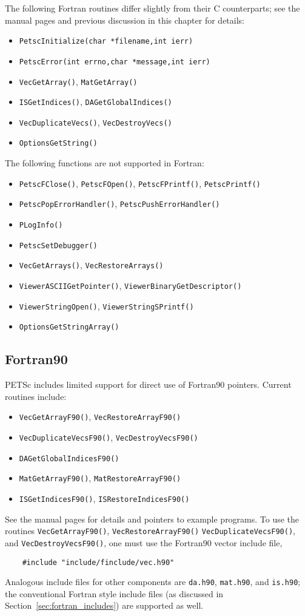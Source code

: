 The following Fortran routines differ slightly from their C counterparts; see the 
manual pages and previous discussion in this chapter for details:
\begin{itemize}
\item {\tt PetscInitialize(char *filename,int ierr)}
\item {\tt PetscError(int errno,char *message,int ierr)}
\item {\tt VecGetArray()}, {\tt MatGetArray()}
\item {\tt ISGetIndices()}, {\tt DAGetGlobalIndices()}
\item {\tt VecDuplicateVecs()}, {\tt VecDestroyVecs()}
\item {\tt OptionsGetString()}
\end{itemize}
The following functions are not supported in Fortran:
\begin{itemize}
\item {\tt PetscFClose()}, {\tt PetscFOpen()}, {\tt PetscFPrintf()}, {\tt PetscPrintf()}
\item {\tt PetscPopErrorHandler()}, {\tt PetscPushErrorHandler()}
\item {\tt PLogInfo()}
\item {\tt PetscSetDebugger()}
\item {\tt VecGetArrays()}, {\tt VecRestoreArrays()}
\item {\tt ViewerASCIIGetPointer()}, {\tt ViewerBinaryGetDescriptor()}
\item {\tt ViewerStringOpen()}, {\tt ViewerStringSPrintf()}
\item {\tt OptionsGetStringArray()}
\end{itemize}

\subsection{Fortran90}

PETSc includes limited support for direct use of Fortran90 pointers.
Current routines include:
\begin{itemize}
\item {\tt VecGetArrayF90()}, {\tt VecRestoreArrayF90()}
\item {\tt VecDuplicateVecsF90()}, {\tt VecDestroyVecsF90()}
\item {\tt DAGetGlobalIndicesF90()}
\item {\tt MatGetArrayF90()}, {\tt MatRestoreArrayF90()}
\item {\tt ISGetIndicesF90()}, {\tt ISRestoreIndicesF90()}
\end{itemize}
See the manual pages for details and pointers to example programs.  To
use the routines {\tt VecGetArrayF90()}, {\tt VecRestoreArrayF90()}
{\tt VecDuplicateVecsF90()}, and {\tt VecDestroyVecsF90()}, one must
use the Fortran90 vector include file,
\begin{verbatim}
    #include "include/finclude/vec.h90"
\end{verbatim}
Analogous include files for other components are {\tt da.h90},
{\tt mat.h90}, and {\tt is.h90}; the conventional Fortran style
include files (as discussed in Section~\ref{sec:fortran_includes})
are supported as well.

